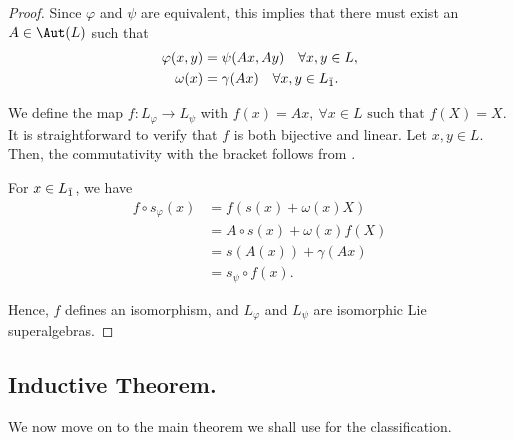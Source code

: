 \documentclass[12pt]{amsart}
\begin{document}
\begin{proof} Since $\varphi$ and $\psi$ are equivalent, this implies that there must exist an $A \in \Aut(L)$ such that
\begin{align*}
\varphi(x,y) &= \psi(Ax,Ay) \quad \forall x,y \in L,\\
\omega(x)&=\gamma(Ax) \quad \forall x,y\in L_{{\bar1}}.
\end{align*}

\noindent We define the map $f : L_{\varphi} \to L_{\psi}$ with $f(x) = Ax, \ \forall x \in L \text{ such that } f(X) = X$. It is straightforward to verify that $f$ is both bijective and linear. Let $x,y \in L$. Then, the commutativity with the bracket follows from \cite[Proposition 5.2.1]{BE}.

\vspace{0.5 em}

\noindent For $x\in L_{{\bar1}}$, we have 
\[
\begin{aligned}
f\circ s_\varphi(x) &= f(s(x)+\omega(x)X) \\
&= A\circ s(x) + \omega(x)f(X) \\
&= s(A(x)) + \gamma(Ax) \\
&=s_{\psi}\circ f(x).
\end{aligned}
\]

\noindent Hence, $f$ defines an isomorphism, and $L_{\varphi}$ and $L_{\psi}$ are isomorphic Lie superalgebras.
\end{proof}

\vspace{0.5 em}

\subsection{Inductive Theorem.} We now move on to the main theorem we shall use for the classification. 
\end{document}
